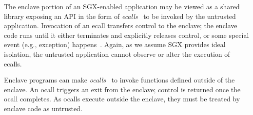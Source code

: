 The enclave portion of an SGX-enabled application may be viewed as a shared
library exposing an API in the form of \emph{ecalls}~\cite{sgxsdk} to be invoked by the
untrusted application. Invocation of an ecall transfers control to the enclave;
the enclave code runs until it either terminates and explicitly releases
control, or some special event (e.g., exception) happens~\cite{sgxmanual}.
Again, as we assume SGX provides ideal isolation, the untrusted application
cannot observe or alter the execution of ecalls.

Enclave programs can make \emph{ocalls}~\cite{sgxsdk} to invoke functions defined outside of
the enclave. An ocall triggers an exit from the enclave; control is returned
once the ocall completes. As ocalls execute outside the enclave, they must be
treated by enclave code as untrusted. 


